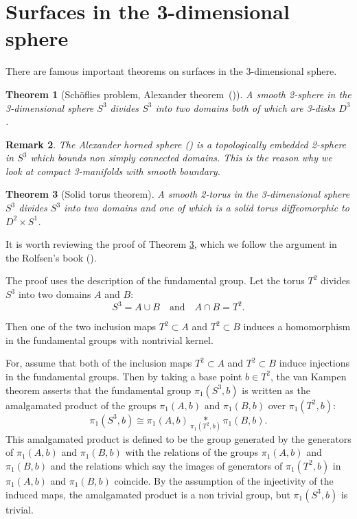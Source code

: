 \documentclass{amsart}
\newtheorem{theorem}{Theorem}[section]
\newtheorem{remark}[theorem]{Remark}
\numberwithin{equation}{section}
\begin{document}
\section{Surfaces in the 3-dimensional sphere}
\label{sec:2}


There are famous important theorems on surfaces in the 3-dimensional sphere. 

\begin{theorem}[Sch\"oflies problem, Alexander theorem\ (\cite{Alexander})]\label{th:Alexander}
A smooth 2-sphere in the 3-dimensional sphere $S^3$ divides $S^3$ into two domains both of which are  3-disks $D^3$.
\end{theorem}

\begin{remark}
The Alexander horned sphere (\cite{AlexanderHS}) is a topologically embedded 2-sphere in $S^3$ which bounds non simply connected domains. This is the reason why we look at compact 3-manifolds with smooth boundary.
\end{remark}

\begin{theorem}[Solid torus theorem]\label{th:solid_torus_theorem}
A smooth 2-torus in the 3-dimensional sphere $S^3$ divides $S^3$ into two domains and one of which is a solid torus diffeomorphic to $D^2\times S^1$.
\end{theorem}

It is worth reviewing the proof of Theorem \ref{th:solid_torus_theorem}, which we follow the argument in the Rolfsen's book (\cite{Rolfsen}).

The proof uses the description of the fundamental group. 
Let the torus $T^2$ divides $S^3$ into two domains $A$ and $B$: $$S^3=A\cup B\quad\text{and}\quad A\cap B=T^2.$$

Then one of the two inclusion maps $T^2\subset A$ and $T^2\subset B$ induces a homomorphism in the fundamental groups with nontrivial kernel. 

For,
assume that both of the inclusion maps $T^2\subset A$ and $T^2\subset B$ induce injections in the fundamental groups. Then by taking a base point $b\in T^2$, the van Kampen theorem asserts that the fundamental group $\pi_1(S^3,b)$ is written as the amalgamated product of the groups $\pi_1(A,b)$ and  $\pi_1(B,b)$ over $\pi_1(T^2,b)$:
$$\pi_1(S^3,b)\cong \pi_1(A,b)\underset{\pi_1(T^2,b)}{*} \pi_1(B,b).$$
This  amalgamated product is defined to be the group generated by the generators of $\pi_1(A,b)$ and $\pi_1(B,b)$ with the relations of the groups $\pi_1(A,b)$ and $\pi_1(B,b)$ and the relations which say the images of generators of $\pi_1(T^2,b)$ in $\pi_1(A,b)$ and $\pi_1(B,b)$ coincide. By the assumption of the injectivity of the induced maps, the amalgamated product is a non trivial group, but $\pi_1(S^3,b)$ is trivial. 
\end{document}
